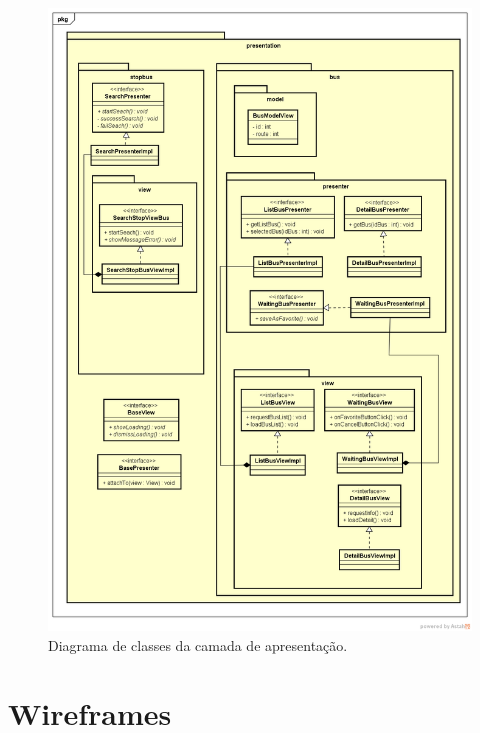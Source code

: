 \documentclass[
	12pt,				%
	oneside,			%
	a4paper,			%
	brazil				%
]{abntex2}
\begin{document}
\begin{apendicesenv}
\begin{figure}[H]
\centering
\includegraphics[width=15cm, center]{images/presentation-layer}
\caption{Diagrama de classes da camada de apresentação.}
\label{Rotulo}
\end{figure}

\chapter{Wireframes}


\end{apendicesenv}
\end{document}
